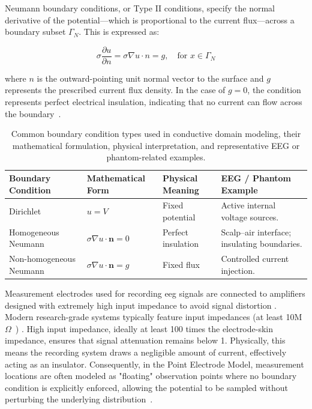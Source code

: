 Neumann boundary conditions, or Type II conditions, specify the normal derivative of the potential—which is proportional to the current flux—across a boundary subset $\Gamma_N$. This is expressed as:

$$\sigma \frac{\partial u}{\partial n} = \sigma \nabla u \cdot n = g, \quad \text{for } x \in \Gamma_N$$

where $n$ is the outward-pointing unit normal vector to the surface and $g$ represents the prescribed current flux density. In the case of $g = 0$, the condition represents perfect electrical insulation, indicating that no current can flow across the boundary~\cite{simscale-boundary-conditions,simion}.

\begin{table}[htbp]
\centering
\caption[Boundary condition types in conductive models]{Common boundary condition types used in conductive domain modeling, their mathematical formulation, physical interpretation, and representative EEG or phantom-related examples.}
\label{tab:boundary_conditions}
\small
\begin{tabularx}{\textwidth}{l X X X}
\toprule
\textbf{Boundary Condition}
& \textbf{Mathematical Form}
& \textbf{Physical Meaning}
& \textbf{EEG / Phantom Example} \\
\midrule
Dirichlet
& $u = V$
& Fixed potential
& Active internal voltage sources. \\
Homogeneous Neumann
& $\sigma \nabla u \cdot \mathbf{n} = 0$
& Perfect insulation
& Scalp–air interface; insulating boundaries. \\
Non-homogeneous Neumann
& $\sigma \nabla u \cdot \mathbf{n} = g$
& Fixed flux
& Controlled current injection. \\
\bottomrule
\end{tabularx}
\end{table}

Measurement electrodes used for recording \gls{eeg} signals are connected to amplifiers designed with extremely high input impedance to avoid signal distortion . Modern research-grade systems typically feature input impedances (at least 10M$\Omega$~\cite{eeg-measurement-teplan-2002})  . High input impedance, ideally at least 100 times the electrode-skin impedance, ensures that signal attenuation remains below 1. Physically, this means the recording system draws a negligible amount of current, effectively acting as an insulator. Consequently, in the Point Electrode Model, measurement locations are often modeled as "floating" observation points where no boundary condition is explicitly enforced, allowing the potential to be sampled without perturbing the underlying distribution~\cite{pursiainen-2012}.


